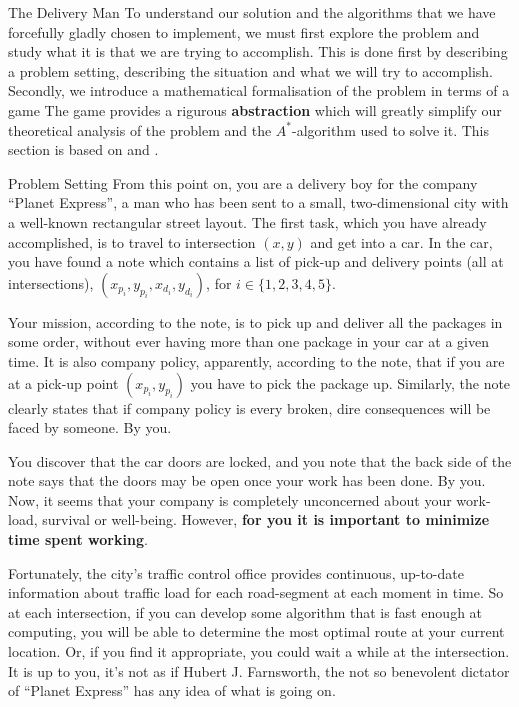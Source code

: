 \begin{section}{The Delivery Man}
  To understand our solution and the algorithms that we have forcefully gladly chosen to implement, we must first explore the problem and study what it is that we are trying to accomplish. This is done first by describing a problem setting, describing the situation and what we will try to accomplish.
  Secondly, we introduce a mathematical formalisation of the problem in terms of a game The game provides a rigurous \textbf{abstraction} which will greatly simplify our theoretical analysis of the problem and the $A^*$-algorithm used to solve it. This section is based on \cite{run} and \cite{lab}.
  
  \begin{subsection}{Problem Setting}
    From this point on, you are a delivery boy for the company ``Planet Express'', a man who has been sent to a small, two-dimensional city with a well-known rectangular street layout. The first task, which you have already accomplished, is to travel to intersection $(x, y)$ and get into a car. In the car, you have found a note which contains a list of pick-up and delivery points (all at intersections), $(x_{p_i}, y_{p_i}, x_{d_i}, y_{d_i})$, for $i\in \{1,2,3,4, 5\}$. 

    Your mission, according to the note, is to pick up and deliver all the packages in some order, without ever having more than one package in your car at a given time. It is also company policy, apparently, according to the note, that if you are at a pick-up point $(x_{p_i}, y_{p_i})$ you have to pick the package up. Similarly, the note clearly states that if company policy is every broken, dire consequences will be faced by someone. By you.
    
    You discover that the car doors are locked, and you note that the back side of the note says that the doors may be open once your work has been done. By you. Now, it seems that your company is completely unconcerned about your work-load, survival or well-being. However, \textbf{for you it is important to minimize time spent working}.

    Fortunately, the city's traffic control office provides continuous, up-to-date information about traffic load for each road-segment at each moment in time. So at each intersection, if you can develop some algorithm that is fast enough at computing, you will be able to determine the most optimal route at your current location. Or, if you find it appropriate, you could wait a while at the intersection. It is up to you, it's not as if Hubert J. Farnsworth, the not so benevolent dictator of ``Planet Express'' has any idea of what is going on.
  \end{subsection}


\end{section}
